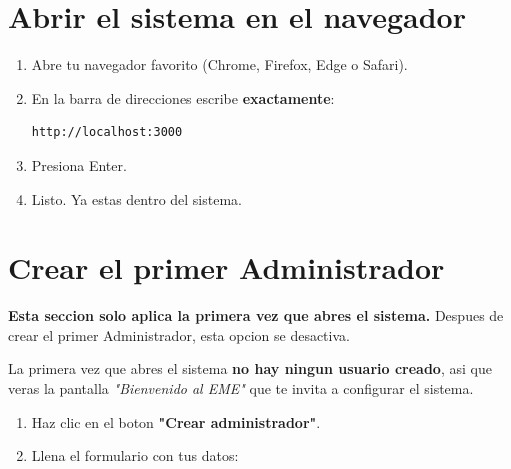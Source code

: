 \documentclass[11pt,a4paper]{article}
\begin{document}
\section{Abrir el sistema en el navegador}

\begin{enumerate}
    \item Abre tu navegador favorito (Chrome, Firefox, Edge o Safari).
    \item En la barra de direcciones escribe \textbf{exactamente}:
          \begin{lstlisting}
http://localhost:3000
\end{lstlisting}
    \item Presiona Enter.
    \item Listo. Ya estas dentro del sistema.
\end{enumerate}

\section{Crear el primer Administrador}

\begin{cajaInfo}
    \textbf{Esta seccion solo aplica la primera vez que abres el sistema.} Despues de crear el primer Administrador, esta opcion se desactiva.
\end{cajaInfo}

La primera vez que abres el sistema \textbf{no hay ningun usuario creado}, asi que veras la pantalla \textit{"Bienvenido al EME"} que te invita a configurar el sistema.
\begin{enumerate}
    \item Haz clic en el boton \textbf{"Crear administrador"}.
    \item Llena el formulario con tus datos:
\end{enumerate}
\end{document}
